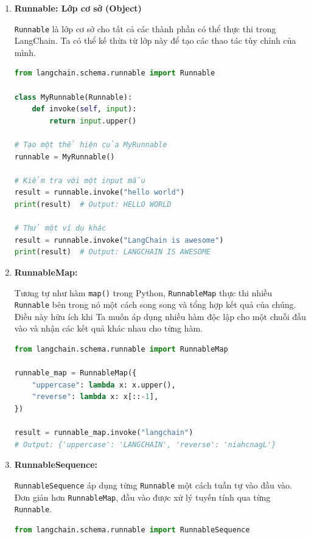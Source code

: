 \documentclass[11pt]{article}
\begin{document}
\begin{enumerate}
    \item \textbf{Runnable: Lớp cơ sở (Object)}
    \begin{boxC}
        \texttt{Runnable} là lớp cơ sở cho tất cả các thành phần có thể thực thi trong LangChain. Ta có thể kế thừa từ lớp này để tạo các thao tác tùy chỉnh của mình.
        \begin{lstlisting}[language=Python, caption=Ví dụ về Runnable cơ bản]
from langchain.schema.runnable import Runnable

class MyRunnable(Runnable):
    def invoke(self, input):
        return input.upper()

# Tạo một thể hiện của MyRunnable
runnable = MyRunnable()

# Kiểm tra với một input mẫu
result = runnable.invoke("hello world")
print(result)  # Output: HELLO WORLD

# Thử một ví dụ khác
result = runnable.invoke("LangChain is awesome")
print(result)  # Output: LANGCHAIN IS AWESOME
        \end{lstlisting}
    \end{boxC}

    \item \textbf{RunnableMap:}
    \begin{boxC}
        Tương tự như hàm \texttt{map()} trong Python, \texttt{RunnableMap} thực thi nhiều \texttt{Runnable} bên trong nó một cách song song và tổng hợp kết quả của chúng. Điều này hữu ích khi Ta muốn áp dụng nhiều hàm độc lập cho một chuỗi đầu vào và nhận các kết quả khác nhau cho từng hàm.
        \begin{lstlisting}[language=Python, caption=Ví dụ về RunnableMap]
from langchain.schema.runnable import RunnableMap

runnable_map = RunnableMap({
    "uppercase": lambda x: x.upper(),
    "reverse": lambda x: x[::-1],
})

result = runnable_map.invoke("langchain")
# Output: {'uppercase': 'LANGCHAIN', 'reverse': 'niahcnagL'}
        \end{lstlisting}
    \end{boxC}

    \item \textbf{RunnableSequence:}
    \begin{boxC}
        \texttt{RunnableSequence} áp dụng từng \texttt{Runnable} một cách tuần tự vào đầu vào. Đơn giản hơn \texttt{RunnableMap}, đầu vào được xử lý tuyến tính qua từng \texttt{Runnable}.
        \begin{lstlisting}[language=Python, caption=Ví dụ về RunnableSequence]
from langchain.schema.runnable import RunnableSequence


\end{lstlisting}
\end{boxC}
\end{enumerate}
\end{document}
